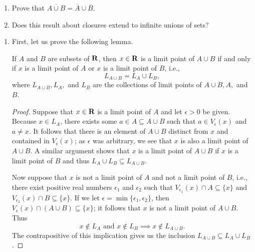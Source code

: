 \documentclass{lew98_solutions}
\begin{document}
\begin{exercise}
\label{ex:3.2.11}
    \begin{enumerate}
        \item Prove that \( \overline{A \cup B} = \overline{A} \cup \overline{B} \).

        \item Does this result about closures extend to infinite unions of sets?
    \end{enumerate}
\end{exercise}

\begin{solution}
    \begin{enumerate}
        \item First, let us prove the following lemma.
        \begin{lemma}
        \label{lem:ex3.2.11}
            If \( A \) and \( B \) are subsets of \( \mathbf{R} \), then \( x \in \mathbf{R} \) is a limit point of \( A \cup B \) if and only if \( x \) is a limit point of \( A \) or \( x \) is a limit point of \( B \), i.e.,
            \[
                L_{A \cup B} = L_A \cup L_B,
            \]
            where \( L_{A \cup B}, L_A, \) and \( L_B \) are the collections of limit points of \( A \cup B, A, \) and \( B \).
        \end{lemma}
        \begin{proof}
            Suppose that \( x \in \mathbf{R} \) is a limit point of \( A \) and let \( \epsilon > 0 \) be given. Because \( x \in L_A \), there exists some \( a \in A \subseteq A \cup B \) such that \( a \in V_{\epsilon}(x) \) and \( a \neq x \). It follows that there is an element of \( A \cup B \) distinct from \( x \) and contained in \( V_{\epsilon}(x) \); as \( \epsilon \) was arbitrary, we see that \( x \) is also a limit point of \( A \cup B \). A similar argument shows that \( x \) is a limit point of \( A \cup B \) if \( x \) is a limit point of \( B \) and thus \( L_A \cup L_B \subseteq L_{A \cup B} \).

            Now suppose that \( x \) is not a limit point of \( A \) and not a limit point of \( B \), i.e., there exist positive real numbers \( \epsilon_1 \) and \( \epsilon_2 \) such that \( V_{\epsilon_1}(x) \cap A \subseteq \{ x \} \) and \( V_{\epsilon_2}(x) \cap B \subseteq \{ x \} \). If we let \( \epsilon = \min \{ \epsilon_1, \epsilon_2 \} \), then \( V_{\epsilon}(x) \cap (A \cup B) \subseteq \{ x \} \); it follows that \( x \) is not a limit point of \( A \cup B \). Thus
            \[
                x \not\in L_A \text{ and } x \not\in L_B \implies x \not\in L_{A \cup B}.
            \]
            The contrapositive of this implication gives us the inclusion \( L_{A \cup B} \subseteq L_A \cup L_B \).
        \end{proof}


\end{enumerate}
\end{solution}
\end{document}
